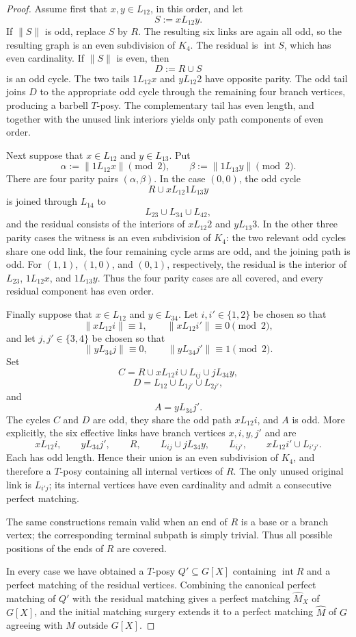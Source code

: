 \documentclass[10pt,a4paper]{amsart}
\begin{document}
\begin{proof}
Assume first that \(x,y\in L_{12}\), in this order, and let
\[
S:=xL_{12}y.
\]
If \(\|S\|\) is odd, replace \(S\) by \(R\). The resulting six links
are again all odd, so the resulting graph is an even subdivision of
\(K_4\). The residual is \(\operatorname{int}S\), which has even
cardinality. If \(\|S\|\) is even, then
\[
D:=R\cup S
\]
is an odd cycle. The two tails \(1L_{12}x\) and \(yL_{12}2\) have
opposite parity. The odd tail joins \(D\) to the appropriate odd cycle
through the remaining four branch vertices, producing a barbell
\(T\)-posy. The complementary tail has even length, and together with
the unused link interiors yields only path components of even order.

Next suppose that \(x\in L_{12}\) and \(y\in L_{13}\). Put
\[
\alpha:=\|1L_{12}x\|\pmod2,
\qquad
\beta:=\|1L_{13}y\|\pmod2.
\]
There are four parity pairs \((\alpha,\beta)\). In the case
\((0,0)\), the odd cycle
\[
R\cup xL_{12}1L_{13}y
\]
is joined through \(L_{14}\) to
\[
L_{23}\cup L_{34}\cup L_{42},
\]
and the residual consists of the interiors of \(xL_{12}2\) and
\(yL_{13}3\). In the other three parity cases the witness is an even
subdivision of \(K_4\): the two relevant odd cycles share one odd link,
the four remaining cycle arms are odd, and the joining path is odd.
For \((1,1)\), \((1,0)\), and \((0,1)\), respectively, the residual is
the interior of \(L_{23}\), \(1L_{12}x\), and \(1L_{13}y\). Thus the
four parity cases are all covered, and every residual component has even
order.

Finally suppose that \(x\in L_{12}\) and \(y\in L_{34}\). Let
\(i,i'\in\{1,2\}\) be chosen so that
\[
\|xL_{12}i\|\equiv1,
\qquad
\|xL_{12}i'\|\equiv0
\pmod2,
\]
and let \(j,j'\in\{3,4\}\) be chosen so that
\[
\|yL_{34}j\|\equiv0,
\qquad
\|yL_{34}j'\|\equiv1
\pmod2.
\]
Set
\[
C=
R\cup xL_{12}i\cup L_{ij}\cup jL_{34}y,
\]
\[
D=
L_{12}\cup L_{1j'}\cup L_{2j'},
\]
and
\[
A=yL_{34}j'.
\]
The cycles \(C\) and \(D\) are odd, they share the odd path
\(xL_{12}i\), and \(A\) is odd. More explicitly, the six effective
links have branch vertices \(x,i,y,j'\) and are
\[
xL_{12}i,
\qquad
yL_{34}j',
\qquad
R,
\qquad
L_{ij}\cup jL_{34}y,
\qquad
L_{ij'},
\qquad
xL_{12}i'\cup L_{i'j'}.
\]
Each has odd length. Hence their union is an even subdivision of
\(K_4\), and therefore a \(T\)-posy containing all internal vertices
of \(R\). The only unused original link is \(L_{i'j}\); its internal
vertices have even cardinality and admit a consecutive perfect
matching.

The same constructions remain valid when an end of \(R\) is a base or
a branch vertex; the corresponding terminal subpath is simply trivial.
Thus all possible positions of the ends of \(R\) are covered.

In every case we have obtained a \(T\)-posy \(Q'\subseteq G[X]\)
containing \(\operatorname{int}R\) and a perfect matching of the
residual vertices. Combining the canonical perfect matching of \(Q'\)
with the residual matching gives a perfect matching
\(\widehat M_X\) of \(G[X]\), and the initial matching surgery extends
it to a perfect matching \(\widehat M\) of \(G\) agreeing with \(M\)
outside \(G[X]\).
\end{proof}
\end{document}
